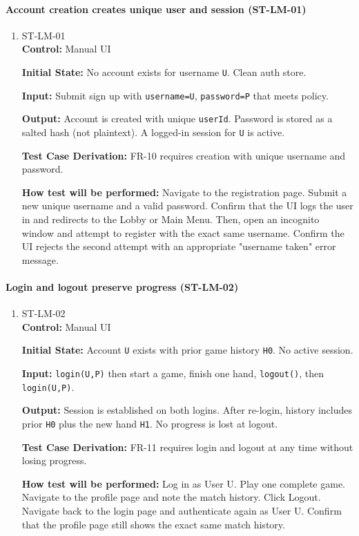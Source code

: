 \documentclass[12pt, titlepage]{article}
\begin{document}
\paragraph{Account creation creates unique user and session (ST-LM-01)}
\begin{enumerate}
\item{ST-LM-01\\}
\textbf{Control:} Manual UI

\textbf{Initial State:} No account exists for username \texttt{U}. Clean auth store.

\textbf{Input:} Submit sign up with \texttt{username=U}, \texttt{password=P} that meets policy.

\textbf{Output:} Account is created with unique \texttt{userId}. Password is stored as a salted hash (not plaintext). A logged-in session for \texttt{U} is active.

\textbf{Test Case Derivation:} FR-10 requires creation with unique username and password.

\textbf{How test will be performed:} Navigate to the registration page. Submit a new unique username and a valid password. Confirm that the UI logs the user in and redirects to the Lobby or Main Menu. Then, open an incognito window and attempt to register with the exact same username. Confirm the UI rejects the second attempt with an appropriate "username taken" error message.
\end{enumerate}

\paragraph{Login and logout preserve progress (ST-LM-02)}
\begin{enumerate}
\item{ST-LM-02\\}
\textbf{Control:} Manual UI

\textbf{Initial State:} Account \texttt{U} exists with prior game history \texttt{H0}. No active session.

\textbf{Input:} \texttt{login(U,P)} then start a game, finish one hand, \texttt{logout()}, then \texttt{login(U,P)}.

\textbf{Output:} Session is established on both logins. After re-login, history includes prior \texttt{H0} plus the new hand \texttt{H1}. No progress is lost at logout.

\textbf{Test Case Derivation:} FR-11 requires login and logout at any time without losing progress.

\textbf{How test will be performed:} Log in as User U. Play one complete game. Navigate to the profile page and note the match history. Click Logout. Navigate back to the login page and authenticate again as User U. Confirm that the profile page still shows the exact same match history.
\end{enumerate}
\end{document}
